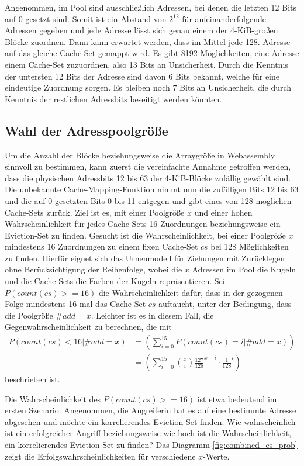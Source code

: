 Angenommen, im Pool sind ausschließlich Adressen, bei denen die letzten 12 Bits auf 0 gesetzt sind. 
Somit ist ein Abstand von $2^{12}$ für aufeinanderfolgende Adressen gegeben und jede Adresse lässt sich genau einem der 4-KiB-großen Blöcke zuordnen.
Dann kann erwartet werden, dass im Mittel jede 128. 
Adresse auf das gleiche Cache-Set gemappt wird. Es gibt 8192 Möglichkeiten, eine Adresse einem Cache-Set zuzuordnen, also 13 Bits an Unsicherheit.
Durch die Kenntnis der untersten 12 Bits der Adresse sind davon 6 Bits bekannt, welche für eine eindeutige Zuordnung sorgen. 
Es bleiben noch 7 Bits an Unsicherheit, die durch Kenntnis der restlichen Adressbits beseitigt werden könnten.

\subsection{Wahl der Adresspoolgröße}
\label{addressPoolSize}

Um die Anzahl der Blöcke beziehungsweise die Arraygröße in Webassembly sinnvoll zu bestimmen, kann zuerst die vereinfachte Annahme getroffen werden, dass die physischen Adressbits 12 bis 63 der 4-KiB-Blöcke zufällig gewählt sind. 
Die unbekannte Cache-Mapping-Funktion nimmt nun die zufälligen Bits 12 bis 63 und die auf 0 gesetzten Bits 0 bis 11 entgegen und gibt eines von 128 möglichen Cache-Sets zurück.
Ziel ist es, mit einer Poolgröße $x$ und einer hohen Wahrscheinlichkeit für jedes Cache-Sets 16 Zuordnungen beziehungsweise ein Eviction-Set zu finden.
Gesucht ist die Wahrscheinlichkeit, bei einer Poolgröße $x$ mindestens 16 Zuordnungen zu einem fixen Cache-Set $cs$ bei 128 Möglichkeiten zu finden.
Hierfür eignet sich das Urnenmodell für Ziehungen mit Zurücklegen ohne Berücksichtigung der Reihenfolge, wobei die $x$ Adressen im Pool die Kugeln und die Cache-Sets die Farben der Kugeln repräsentieren. Sei $P(count(cs)>=16)$ die Wahrscheinlichkeit dafür, dass in der gezogenen Folge mindestens 16 mal das Cache-Set $cs$ auftaucht, unter der Bedingung, dass die Poolgröße $\#add = x$.
Leichter ist es in diesem Fall, die Gegenwahrscheinlichkeit zu berechnen, die mit
\begin{align*}
P(count(cs)<16|\#add = x) &=
\left( \sum\limits_{i=0}^{15}P(count(cs)=i|\#add = x) \right) \\&=
\left( \sum\limits_{i=0}^{15} {x \choose i} \frac{127}{128}^{x-i} \cdot \frac{1}{128}^i  \right)
\end{align*}
beschrieben ist.

Die Wahrscheinlichkeit des $P(count(cs)>=16)$ ist etwa bedeutend im ersten Szenario:
Angenommen, die Angreiferin hat es auf eine bestimmte Adresse abgesehen und möchte ein korrelierendes Eviction-Set finden. 
Wie wahrscheinlich ist ein erfolgreicher Angriff beziehungsweise wie hoch ist die Wahrscheinlichkeit, ein korrelierendes Eviction-Set zu finden? 
Das Diagramm \ref{fig:combined_es_prob} zeigt die Erfolgswahrscheinlichkeiten für verschiedene $x$-Werte. 

